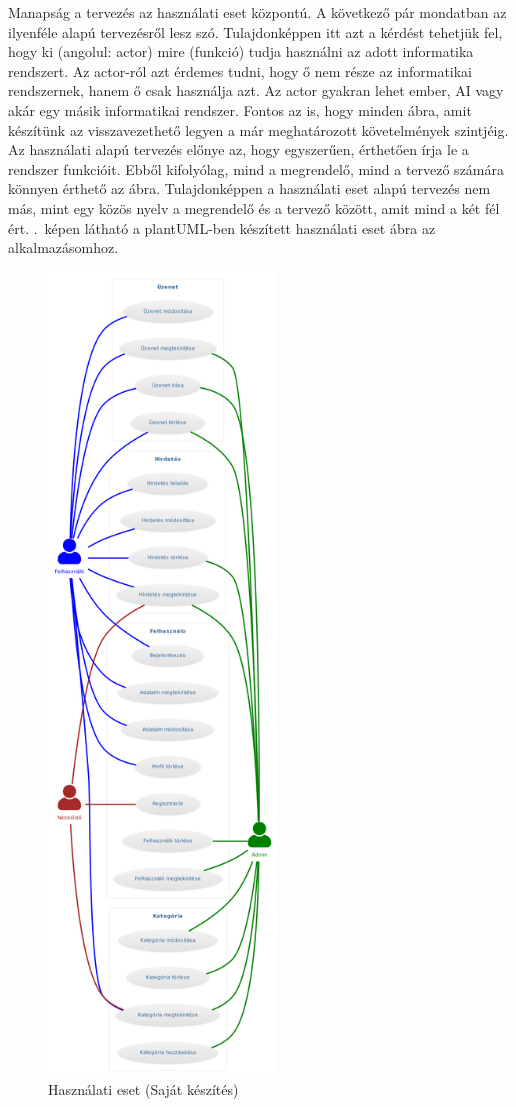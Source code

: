 \documentclass[]{thesis-ekf}
\theoremstyle{definition}
\theoremstyle{remark}
\begin{document}
	Manapság a tervezés az használati eset központú. A következő pár mondatban az ilyenféle alapú tervezésről lesz szó. Tulajdonképpen itt azt a kérdést tehetjük fel, hogy ki (angolul: actor) mire (funkció) tudja használni az adott informatika rendszert. Az actor-ról azt érdemes tudni, hogy ő nem része az informatikai rendszernek, hanem ő csak használja azt. Az actor gyakran lehet ember, AI vagy akár egy másik informatikai rendszer. Fontos az is, hogy minden ábra, amit készítünk az visszavezethető legyen a már meghatározott követelmények szintjéig. Az használati alapú tervezés előnye az, hogy egyszerűen, érthetően írja le a rendszer funkcióit. Ebből kifolyólag, mind a megrendelő, mind a tervező számára könnyen érthető az ábra. Tulajdonképpen a használati eset alapú tervezés nem más, mint egy közös nyelv a megrendelő és a tervező között, amit mind a két fél ért.\cite{Kusper Informatikai} .~képen látható a plantUML-ben készített használati eset ábra az alkalmazásomhoz.
	\begin{figure}[ht!]
		\centering
		\includegraphics[width=6cm]{./tervezes/useCase}
		\caption{Használati eset (Saját készítés)} 
		\label{useCase}
	\end{figure}
\end{document}
